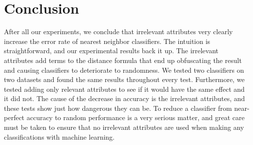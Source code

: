 \documentclass{article}
\begin{document}
\section{Conclusion}

After all our experiments, we conclude that irrelevant attributes very clearly increase the error rate of nearest neighbor classifiers. The intuition is straightforward, and our experimental results back it up. The irrelevant attributes add terms to the distance formula that end up obfuscating the result and causing classifiers to deteriorate to randomness. We tested two classifiers on two datasets and found the same results throughout every test. Furthermore, we tested adding only relevant attributes to see if it would have the same effect and it did not. The cause of the decrease in accuracy is the irrelevant attributes, and these tests show just how dangerous they can be. To reduce a classifier from near-perfect accuracy to random performance is a very serious matter, and great care must be taken to ensure that no irrelevant attributes are used when making any classifications with machine learning.



 
\end{document}
